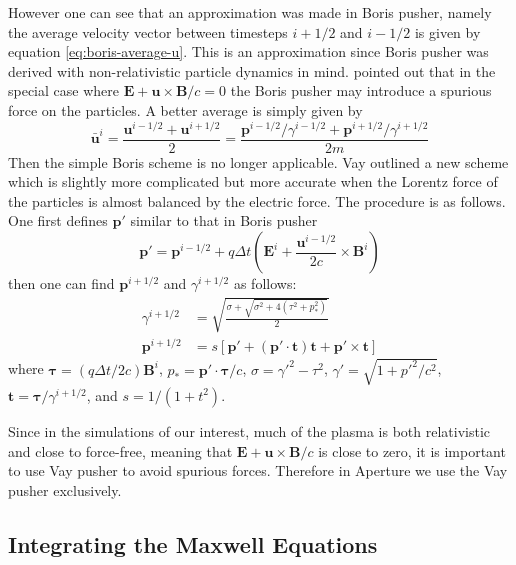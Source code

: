 However one can see that an approximation was made in Boris pusher, namely the
average velocity vector between timesteps $i+1/2$ and $i-1/2$ is given by
equation \eqref{eq:boris-average-u}. This is an approximation since
Boris pusher was derived with non-relativistic particle dynamics in mind.
\citet{vay_simulation_2008} pointed out that in the special case where
$\mathbf{E} + \mathbf{u}\times \mathbf{B}/c = 0$ the Boris pusher may introduce a
spurious force on the particles. A better average is simply given by
\begin{equation}
  \label{eq:vay-average-u}
  \mathbf{\bar{u}}^i = \frac{\mathbf{u}^{i-1/2} + \mathbf{u}^{i+1/2}}{2} = \frac{\mathbf{p}^{i-1/2}/\gamma^{i-1/2} + \mathbf{p}^{i+1/2}/\gamma^{i+1/2}}{2m}
\end{equation}
Then the simple Boris scheme is no longer applicable. Vay outlined a new scheme
which is slightly more complicated but more accurate when the Lorentz force of
the particles is almost balanced by the electric force. The procedure is as
follows. One first defines $\mathbf{p}'$ similar to that in Boris pusher
\begin{equation}
  \label{eq:vay-p-prime}
  \mathbf{p}' = \mathbf{p}^{i-1/2} + q\Delta t\left( \mathbf{E}^i + \frac{\mathbf{u}^{i-1/2}}{2c}\times \mathbf{B}^i \right)
\end{equation}
then one can find $\mathbf{p}^{i+1/2}$ and $\gamma^{i+1/2}$ as follows:
\begin{align}
  \label{eq:vay-solution}
  \gamma^{i+1/2} &= \sqrt{\frac{\sigma + \sqrt{\sigma^2 + 4(\tau^2 + p_{*}^2)}}{2}} \\
  \mathbf{p}^{i+1/2} &= s \left[ \mathbf{p}' + (\mathbf{p}'\cdot \mathbf{t})\mathbf{t} + \mathbf{p}'\times \mathbf{t} \right]
\end{align}
where $\bm{\tau} = (q\Delta t/2c)\mathbf{B}^i$, $p_{*}=\mathbf{p}'\cdot\bm{\tau}/c$,
$\sigma = \gamma'^2-\tau^2$, $\gamma' = \sqrt{1 + p'^2/c^2}$, $\mathbf{t} =
\bm{\tau}/\gamma^{i+1/2}$, and $s = 1/(1 + t^2)$.

Since in the simulations of our interest, much of the plasma is both
relativistic and close to force-free, meaning that $\mathbf{E} +
\mathbf{u}\times \mathbf{B}/c$ is close to zero, it is important to use Vay
pusher to avoid spurious forces. Therefore in Aperture we use the Vay pusher
exclusively.

\subsection{Integrating the Maxwell Equations}
\label{sec:fd-maxwell}

